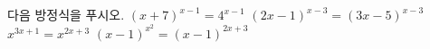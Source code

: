 다음 방정식을 푸시오.
 $(x+7)^{x-1}=4^{x-1}$ 
 $(2x-1)^{x-3}=(3x-5)^{x-3}$ 
 $x^{3x+1}=x^{2x+3}$ 
 $(x-1)^{x^2}=(x-1)^{2x+3}$ 
